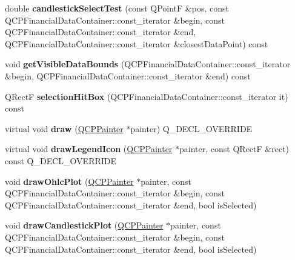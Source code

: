 \begin{DoxyCompactItemize}
\item 
\mbox{\label{class_q_c_p_financial_a9783e91a33fd08a402b1a3821d43e471}} 
double {\bfseries candlestick\+Select\+Test} (const Q\+PointF \&pos, const Q\+C\+P\+Financial\+Data\+Container\+::const\+\_\+iterator \&begin, const Q\+C\+P\+Financial\+Data\+Container\+::const\+\_\+iterator \&end, Q\+C\+P\+Financial\+Data\+Container\+::const\+\_\+iterator \&closest\+Data\+Point) const
\item 
\mbox{\label{class_q_c_p_financial_a31a3dda8b6b9a5b674e28f1daeb21a75}} 
void {\bfseries get\+Visible\+Data\+Bounds} (Q\+C\+P\+Financial\+Data\+Container\+::const\+\_\+iterator \&begin, Q\+C\+P\+Financial\+Data\+Container\+::const\+\_\+iterator \&end) const
\item 
\mbox{\label{class_q_c_p_financial_afbe9e8cb0de3e9e789a9668b29cad098}} 
Q\+RectF {\bfseries selection\+Hit\+Box} (Q\+C\+P\+Financial\+Data\+Container\+::const\+\_\+iterator it) const
\item 
\mbox{\label{class_q_c_p_financial_a0b631bf26922fcad254f6c01f1e57c8f}} 
virtual void {\bfseries draw} (\hyperlink{class_q_c_p_painter}{Q\+C\+P\+Painter} $\ast$painter) Q\+\_\+\+D\+E\+C\+L\+\_\+\+O\+V\+E\+R\+R\+I\+DE
\item 
\mbox{\label{class_q_c_p_financial_a7ece3ce5522ea36a19fdf64ff97e79ec}} 
virtual void {\bfseries draw\+Legend\+Icon} (\hyperlink{class_q_c_p_painter}{Q\+C\+P\+Painter} $\ast$painter, const Q\+RectF \&rect) const Q\+\_\+\+D\+E\+C\+L\+\_\+\+O\+V\+E\+R\+R\+I\+DE
\item 
\mbox{\label{class_q_c_p_financial_a2c77aab636f6bce6e0407b3f94e90d08}} 
void {\bfseries draw\+Ohlc\+Plot} (\hyperlink{class_q_c_p_painter}{Q\+C\+P\+Painter} $\ast$painter, const Q\+C\+P\+Financial\+Data\+Container\+::const\+\_\+iterator \&begin, const Q\+C\+P\+Financial\+Data\+Container\+::const\+\_\+iterator \&end, bool is\+Selected)
\item 
\mbox{\label{class_q_c_p_financial_ade6b703369d8acb3bfa0b8e244df4b06}} 
void {\bfseries draw\+Candlestick\+Plot} (\hyperlink{class_q_c_p_painter}{Q\+C\+P\+Painter} $\ast$painter, const Q\+C\+P\+Financial\+Data\+Container\+::const\+\_\+iterator \&begin, const Q\+C\+P\+Financial\+Data\+Container\+::const\+\_\+iterator \&end, bool is\+Selected)

\end{DoxyCompactItemize}
